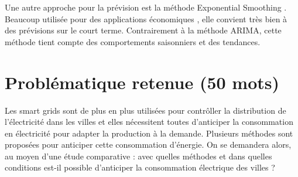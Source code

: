 \documentclass[12pt,a4paper]{article}
\begin{document}
Une autre approche pour la prévision est la méthode Exponential Smoothing \cite{exporeview} \cite{exporeview2} . Beaucoup utilisée pour des applications économiques \cite{zambiaeconomy}, elle convient très bien à des prévisions sur le court terme. Contrairement à la méthode ARIMA, cette méthode tient compte des comportements saisonniers et des tendances.

\section*{Problématique retenue (50 mots)}
 Les smart grids sont de plus en plus utilisées pour contrôller la distribution de l'électricité dans les villes et elles nécessitent toutes d'anticiper la consommation en électricité pour adapter la production à la demande. Plusieurs méthodes sont proposées pour anticiper cette consommation d'énergie. On se demandera alors, au moyen d'une étude comparative : avec quelles méthodes et dans quelles conditions est-il possible d'anticiper la consommation électrique des villes ?
\end{document}
